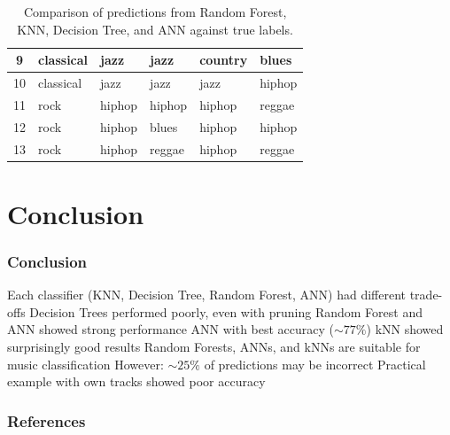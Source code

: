 \documentclass[10pt, aspectratio=169]{beamer}
\begin{document}
\begin{frame}
\begin{table}[h!]
{\begin{tabular}{|c|l|l|l|l|l|}
        9                  & classical           & \cellcolor{red!30}jazz            & \cellcolor{red!30}jazz   & \cellcolor{red!30}country         & \cellcolor{red!30}blues \\ \hline
        10                 & classical           & \cellcolor{red!30}jazz            & \cellcolor{red!30}jazz   & \cellcolor{red!30}jazz            & \cellcolor{red!30}hiphop \\ \hline
        11                 & rock                & \cellcolor{red!30}hiphop          & \cellcolor{red!30}hiphop & \cellcolor{red!30}hiphop          & \cellcolor{red!30}reggae \\ \hline
        12                 & rock                & \cellcolor{red!30}hiphop          & \cellcolor{red!30}blues  & \cellcolor{red!30}hiphop          & \cellcolor{red!30}hiphop \\ \hline
        13                 & rock                & \cellcolor{red!30}hiphop          & \cellcolor{red!30}reggae & \cellcolor{red!30}hiphop          & \cellcolor{red!30}reggae \\ \hline
        \end{tabular}
}
        \caption{Comparison of predictions from Random Forest, KNN, Decision Tree, and ANN against true labels.}
        \label{tab:model_predictions}
        \end{table}
\end{frame}
\section{Conclusion}
\begin{frame}
    \frametitle{Conclusion}
    \begin{outline}
        \1 Each classifier (KNN, Decision Tree, Random Forest, ANN) had different trade-offs
        \1 Decision Trees performed poorly, even with pruning
        \1 Random Forest and ANN showed strong performance
            \2 ANN with best accuracy ($\sim 77\%$)
            \2 kNN showed surprisingly good results
        \1 Random Forests, ANNs, and kNNs are suitable for music classification
            \2 However: $\sim 25\%$ of predictions may be incorrect
        \1 Practical example with own tracks showed poor accuracy
    \end{outline}
\end{frame}
\begin{frame}[noframenumbering]
    \frametitle{References}
    {\tiny
    
    \nocite{*}}
\end{frame}
\end{document}
